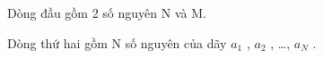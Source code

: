 Dòng đầu gồm 2 số nguyên N và M.  

   Dòng thứ hai gồm N số nguyên của dãy $a_{1}$   , $a_{2}$   , …, $a_{N}$   .